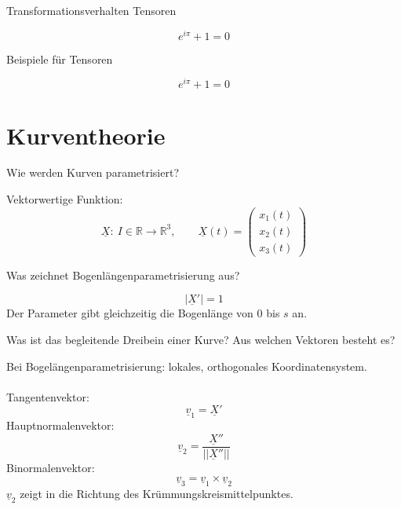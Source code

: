 \documentclass[twocolumn, fontsize=8pt, DIV=1]{scrartcl}
\begin{document}
\begin{framed}
    Transformationsverhalten Tensoren
\end{framed}
\[
    e^{i\pi} + 1 = 0
\]



\begin{framed}
    Beispiele für Tensoren
\end{framed}
\[
    e^{i\pi} + 1 = 0
\]









\section{Kurventheorie}



\begin{framed}
    Wie werden Kurven parametrisiert?
\end{framed}

Vektorwertige Funktion:
\[
\underline{X} : \  I \in \mathbb{R} \to \mathbb{R}^3, \qquad 
\underline{X}(t) =
 \left(
 \begin{array}{c}
 x_1(t)\\
 x_2(t)\\
 x_3(t)
 \end{array}
\right) 
\]



\begin{framed}
    Was zeichnet Bogenlängenparametrisierung aus?
\end{framed}

\[
|\underline{X}'| = 1
\]
Der Parameter gibt gleichzeitig die Bogenlänge von $0$ bis $s$ an.



\begin{framed}
    Was ist das begleitende Dreibein einer Kurve? Aus welchen Vektoren besteht es?
\end{framed}
Bei Bogelängenparametrisierung: lokales, orthogonales Koordinatensystem.\\
\\
Tangentenvektor:
\[
    \underline{v}_1 = \underline{X}'
\]
Hauptnormalenvektor:
\[
    \underline{v}_2 = \frac{\underline{X}''}{||\underline{X}''||}
\]
Binormalenvektor:
\[
    \underline{v}_3 = \underline{v}_1 \times \underline{v}_2
\]
$\underline{v}_2$ zeigt in die Richtung des Krümmungskreismittelpunktes.
\end{document}
